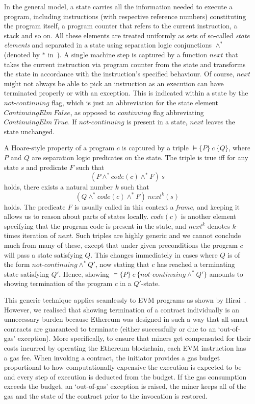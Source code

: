 \documentclass[sigplan,10pt]{acmart}\settopmatter{printfolios=true,printccs=false,printacmref=false}
\newcommand{\sconj}{\wedge^*}
\newcommand{\pvalid}[3]{\models\{#1\}\:#2\:\{#3\}}
\newcommand{\xnext}{\mathit{next}}
\newcommand{\code}[1]{\mathit{code}(#1)}
\newcommand{\cont}{\mathit{continuing}}
\newcommand{\ncont}{\mathit{not\mbox{-}continuing}}
\begin{document}
In the general model, a state carries all the information needed to execute a program, including
instructions (with respective reference numbers) constituting the program itself, a program counter that
refers to the current instruction, a stack and so on. All these elements are treated uniformly 
as sets of so-called \emph{state elements}
and separated in a state using separation logic conjunctions $\sconj$ (denoted by $*$ in~\cite{Reynolds_02}).  
A single machine step is captured by a function $\xnext$ that 
takes the current instruction via program counter from the state and transforms the state in accordance with the instruction's
specified behaviour. Of course, $\xnext$ might not always be able to pick an instruction
as an execution can have terminated properly or with an exception. This is indicated within a state
by the $\ncont$ flag, which is just an abbreviation for the state element 
$\mathit{ContinuingElm}\:\mathit{False}$, 
as opposed to $\cont$ flag abbreviating $\mathit{ContinuingElm}\:\mathit{True}$. 
If $\ncont$ is present in a state, $\xnext$ leaves the state unchanged.   

A Hoare-style property of a program $c$ is captured by a triple
$\pvalid{P}{c}{Q}$, where $P$ and $Q$ are separation logic predicates on the state.
The triple is true iff for any state $s$ and predicate $F$ such that
\[
(P \sconj \code{c} \sconj F)\:s
\] 
holds, there exists a natural number $k$ such that 
\[
(Q \sconj \code{c} \sconj F)\:\xnext^k(s)
\] 
holds. The predicate $F$ is usually called in this context a \emph{frame}, 
and keeping it allows us to reason about parts of states locally. %
$\code{c}$ is another element specifying that the program code is present in the state, and
$\xnext^k$ denotes $k$-times iteration of $\xnext$.
Such triples %
are highly generic and we cannot conclude much from many of these, except that
under given preconditions the program $c$ will pass a state satisfying $Q$. This changes immediately in cases where $Q$ is of
the form $\ncont \sconj Q'$, now stating that $c$ has reached a terminating state satisfying $Q'$.
Hence, showing $\pvalid{P}{c}{\ncont \sconj Q'}$ amounts to showing termination of the program $c$ in
a $Q'$-state.

This generic technique applies seamlessly to EVM programs as
shown by Hirai~\cite{Yoichi}.
However, we realised that showing termination of a contract individually is an unnecessary burden because
Ethereum was designed in such a way that all smart contracts
are guaranteed to terminate (either successfully or due to an `out-of-gas' exception).
More specifically, to ensure that miners get compensated for their costs
incurred by operating the Ethereum blockchain, each EVM instruction
has a gas fee.
When invoking a contract, the initiator provides a gas budget
proportional to how computationally expensive the execution is expected
to be and every step of execution is deducted from the budget.
If the gas consumption exceeds the budget, an `out-of-gas' exception is
raised,
the miner keeps all of the gas and
the state of the contract prior to the
invocation is restored.
\end{document}
